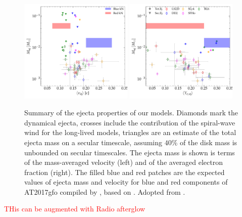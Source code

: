 \documentclass[11pt,a4paper,headinclude=true,DIV=14,BCOR=8mm,chapterprefix,listof=totoc,twoside,openright,abstracton]{scrbook}
\newcommand{\red}[1]{\textcolor{red}{#1}}
\newcommand{\swind}{spiral-wave wind}
\begin{document}
\begin{figure}[t]
    \centering 
    \includegraphics[width=0.48\textwidth]{./figs/ejecta_dyn/summary/ej_mej_vej_our2.pdf}
    \includegraphics[width=0.48\textwidth]{./figs/ejecta_dyn/summary/ej_mej_yeej_our2.pdf}
    \caption{
        Summary of the ejecta properties of our models.
        Diamonds mark the dynamical ejecta, crosses include the
        contribution of the \swind{} for the long-lived models, 
        triangles are an estimate of the total ejecta mass on a secular
        timescale, assuming $40\%$ of the disk mass is unbounded on
        secular timescales.         
        The ejecta mass is shown is terms of the mass-averaged velocity
        (left) and of the averaged electron fraction (right).
        The filled blue and red patches are the expected values of
        ejecta mass and velocity for blue and red components of
        AT2017gfo compiled by \cite{Siegel:2019mlp}, based on
        \cite{Villar:2017wcc}. 
        Adopted from \citet{Nedora:2020pak}.
    }
    \label{fig:ejecta:dyn:ds_sww}
\end{figure}

\red{THis can be augmented with Radio afterglow}
\end{document}
